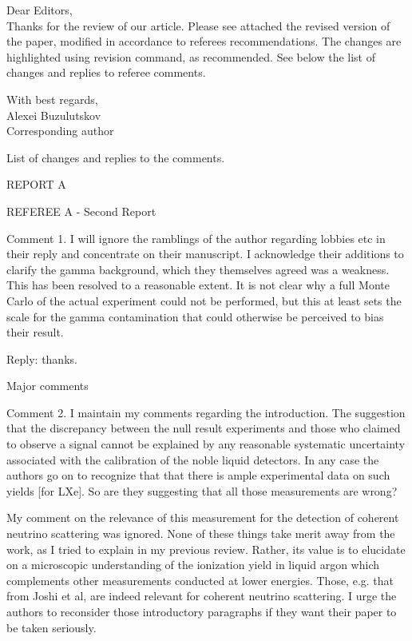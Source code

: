 \documentclass[page-classic]{epl2}
\begin{document}
Dear Editors,\\

Thanks for the review of our article. Please see attached the
revised version of the paper, modified in accordance to referees
recommendations. The changes are highlighted using revision command, as recommended.
See below the list of changes and replies to referee comments.

With best regards, \\
Alexei Buzulutskov \\
Corresponding author

\vspace{0.5 cm}

 List of changes and replies to the comments.

\vspace{0.5 cm}


REPORT A

\vspace{0.5 cm}

REFEREE A - Second Report

\vspace{0.5 cm}

Comment 1. I will ignore the ramblings of the author regarding
lobbies etc in their reply and concentrate on their manuscript.  I
acknowledge their additions to clarify the gamma background, which
they themselves agreed was a weakness. This has been resolved to a
reasonable extent. It is not clear why a full Monte Carlo of the
actual experiment could not be performed, but this at least sets the
scale for the gamma contamination that could otherwise be perceived
to bias their result.

\vspace{0.5 cm}

Reply: thanks.

\vspace{0.5 cm}

Major comments

Comment 2. I maintain my comments regarding the introduction. The
suggestion that the discrepancy between the null result  experiments
and those who claimed to observe a signal cannot be explained by any
reasonable systematic uncertainty associated with the calibration of
the noble liquid detectors. In any case the authors go on to
recognize that that there is ample experimental data on such yields
[for LXe]. So are they suggesting that all those measurements are
wrong?

My comment on the relevance of this measurement for the detection of
coherent neutrino scattering was ignored.  None of these things take
merit away from the work, as I tried to explain in my previous
review. Rather, its value is to elucidate on a microscopic
understanding of the ionization yield in liquid argon which
complements other measurements conducted at lower energies. Those,
e.g. that from Joshi et al, are indeed relevant for coherent
neutrino scattering. I urge the authors to reconsider those
introductory paragraphs if they want their paper to be taken
seriously.
\end{document}
